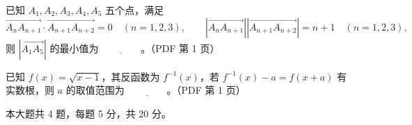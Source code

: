\begin{question}
已知 $A_1,A_2,A_3,A_4,A_5$ 五个点，满足
\nopagebreak[4]
\[
\overrightarrow{A_nA_{n+1}}\cdot\overrightarrow{A_{n+1}A_{n+2}}=0\quad(n=1,2,3),\qquad
\left|\overrightarrow{A_nA_{n+1}}\right|\left|\overrightarrow{A_{n+1}A_{n+2}}\right|=n+1\quad(n=1,2,3),
\]
则 $\left|\overrightarrow{A_1A_5}\right|$ 的最小值为 $\underline{\qquad\qquad}$。（PDF 第 1 页）

\end{question}
\begin{question}
已知 $f(x)=\sqrt{x-1}$，其反函数为 $f^{-1}(x)$，若 $f^{-1}(x)-a=f(x+a)$ 有实数根，则 $a$ 的取值范围为 $\underline{\qquad\qquad}$。（PDF 第 1 页）

\end{question}

\begin{gktip}
本大题共 4 题，每题 5 分，共 20 分。
\end{gktip}

